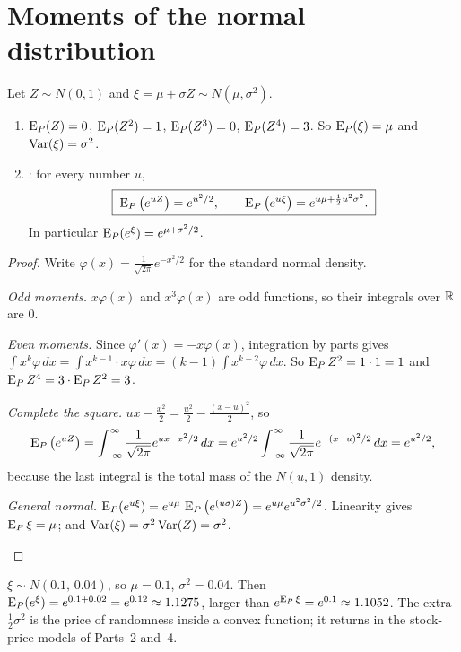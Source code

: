 \section{Moments of the normal distribution}

\begin{result}
\label{res:normal-moments}
Let $Z\sim N(0,1)$ and $\xi=\mu+\sigma Z\sim N(\mu,\sigma^2)$.
\begin{enumerate}[label=(\alph*)]
  \item $\operatorname{E}_P(Z)=0$, $\operatorname{E}_P(Z^2)=1$, $\operatorname{E}_P(Z^3)=0$, $\operatorname{E}_P(Z^4)=3$. So $\operatorname{E}_P(\xi)=\mu$ and $\operatorname{Var}(\xi)=\sigma^2$.
  \item {}: for every number $u$,
  \[
    \boxed{\;\operatorname{E}_P\big(e^{uZ}\big)=e^{u^2/2},\qquad \operatorname{E}_P\big(e^{u\xi}\big)=e^{u\mu+\frac12u^2\sigma^2}.\;}
  \]
  In particular $\operatorname{E}_P(e^{\xi})=e^{\mu+\sigma^2/2}$.
\end{enumerate}
\end{result}
\begin{proof}
Write $\varphi(x)=\frac{1}{\sqrt{2\pi}}e^{-x^2/2}$ for the standard normal density.
\begin{steps}
  \item \emph{Odd moments.} $x\varphi(x)$ and $x^3\varphi(x)$ are odd functions, so their integrals over $\mathbb{R}$ are $0$.
  \item \emph{Even moments.} Since $\varphi'(x)=-x\varphi(x)$, integration by parts gives $\int x^{k}\varphi\,dx=\int x^{k-1}\cdot x\varphi\,dx=(k-1)\int x^{k-2}\varphi\,dx$. So $\operatorname{E}_P Z^2=1\cdot1=1$ and $\operatorname{E}_P Z^4=3\cdot\operatorname{E}_P Z^2=3$.
  \item \emph{Complete the square.} $ux-\frac{x^2}{2}=\frac{u^2}{2}-\frac{(x-u)^2}{2}$, so
  \[
    \operatorname{E}_P\big(e^{uZ}\big)=\int_{-\infty}^{\infty}\frac{1}{\sqrt{2\pi}}e^{ux-x^2/2}\,dx
    =e^{u^2/2}\int_{-\infty}^{\infty}\frac{1}{\sqrt{2\pi}}e^{-(x-u)^2/2}\,dx=e^{u^2/2},
  \]
  because the last integral is the total mass of the $N(u,1)$ density.
  \item \emph{General normal.} $\operatorname{E}_P(e^{u\xi})=e^{u\mu}\,\operatorname{E}_P\big(e^{(u\sigma)Z}\big)=e^{u\mu}e^{u^2\sigma^2/2}$. Linearity gives $\operatorname{E}_P\xi=\mu$; and $\operatorname{Var}(\xi)=\sigma^2\operatorname{Var}(Z)=\sigma^2$. \qedhere
\end{steps}
\end{proof}

\begin{example}
\label{ex:lognormal}
$\xi\sim N(0.1,\,0.04)$, so $\mu=0.1$, $\sigma^2=0.04$. Then $\operatorname{E}_P(e^{\xi})=e^{0.1+0.02}=e^{0.12}\approx1.1275$, larger than $e^{\operatorname{E}_P\xi}=e^{0.1}\approx1.1052$. The extra $\frac12\sigma^2$ is the price of randomness inside a convex function; it returns in the stock-price models of Parts~2 and~4.
\end{example}

